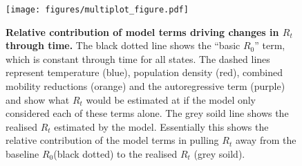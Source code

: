 \documentclass[12pt,english,a4paper]{article}
\newcommand{\RO}{$R_0$\xspace}
\begin{document}
\begin{figure}[ht]
  \centering
  \texttt{[image: figures/multiplot\_figure.pdf]}  
  \caption{ {\bf Relative contribution of model terms driving changes in $R_t$ through time.} The black dotted line shows the ``basic \RO'' term, which is constant through time for all states. The dashed lines represent temperature (blue), population density (red), combined mobility reductions (orange) and the autoregressive term (purple) and show what $R_t$ would be estimated at if the model only considered each of these terms alone. The grey soild line shows the realised $R_t$ estimated by the model. Essentially this shows the relative contribution of the model terms in pulling $R_t$ away from the baseline \RO (black dotted) to the realised $R_t$ (grey soild).}
\label{fig:multiplot}
\end{figure}

\clearpage


\end{document}
